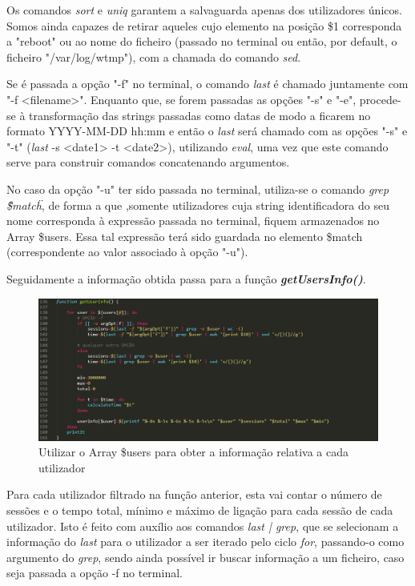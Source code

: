 \documentclass[10pt,portuguese]{article}
\begin{document}
\par Os comandos \textit{sort} e \textit{uniq} garantem a salvaguarda apenas dos utilizadores únicos. Somos ainda capazes de retirar aqueles cujo elemento na posição \$1 corresponda a "reboot" ou ao nome do ficheiro (passado no terminal ou então, por default, o ficheiro "/var/log/wtmp"), com a chamada do comando \textit{sed}. 
\par Se é passada a opção "-f" no terminal, o comando \textit{last} é chamado juntamente com "-f <filename>". Enquanto que, se forem passadas as opções "-s" e "-e",  procede-se à transformação das strings passadas como datas de modo a ficarem no formato YYYY-MM-DD hh:mm e então o \textit{last} será chamado com as opções "-s" e "-t" (\textit{last} -s <date1> -t <date2>), utilizando \textit{eval}, uma vez que este comando serve para construir comandos concatenando argumentos.
\par No caso da opção "-u" ter sido passada no terminal, utiliza-se o comando \textit{grep \"\$match\"}, de forma a que ,somente utilizadores cuja string identificadora do seu nome corresponda à expressão passada no terminal, fiquem armazenados no Array \$users. Essa tal expressão terá sido guardada no elemento \$match (correspondente ao valor associado à opção "-u").
\newline
\newline
\par Seguidamente a informação obtida passa para a função \textbf{\textit{getUsersInfo()}}.
\begin{figure}[!h]
    \centering
    \includegraphics[width=\textwidth]{getUsersInfo.png}
    \caption{Utilizar o Array \$users para obter a informação relativa a cada utilizador}
\end{figure}
\par Para cada utilizador filtrado na função anterior, esta vai contar o número de sessões e o tempo total, mínimo e máximo de ligação para cada sessão de cada utilizador. Isto é feito com auxílio aos comandos \textit{last  |  grep}, que se selecionam a informação do \textit{last} para o utilizador a ser iterado pelo ciclo \textit{for}, passando-o como argumento do \textit{grep}, sendo ainda possível ir buscar informação a um ficheiro, caso seja passada a opção -f no terminal.
\end{document}

